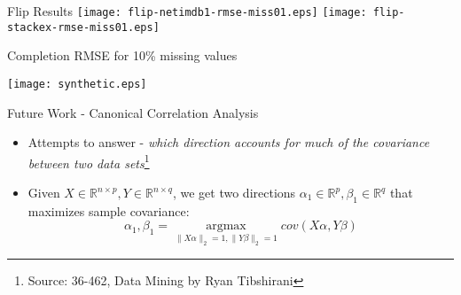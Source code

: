 \documentclass{beamer}
\DeclareMathOperator*{\argmax}{argmax}
\begin{document}
\begin{frame}{Flip Results}
	\texttt{[image: flip-netimdb1-rmse-miss01.eps]}
	\texttt{[image: flip-stackex-rmse-miss01.eps]}
\end{frame}

\begin{frame}{Completion RMSE for 10\% missing values}
    \begin{center}
	\texttt{[image: synthetic.eps]} 
\end{center}
\end{frame}


\begin{frame}{Future Work - Canonical Correlation Analysis}
    \begin{itemize}
        \item Attempts to answer - \textit{which direction accounts for much of the covariance between two data sets}\footnote{Source: 36-462, Data Mining by Ryan Tibshirani}
        \item Given $X \in \mathbb R^{n \times p}, Y \in \mathbb R^{n \times q}$, we get two directions $\alpha_1 \in \mathbb R^p, \beta_1 \in \mathbb R^q$ that maximizes sample covariance:
            \begin{equation}
                \alpha_1, \beta_1 = \argmax\limits_{\|X\alpha\|_2=1,\|Y\beta\|_2=1} cov(X\alpha, Y\beta)
            \end{equation}
    \end{itemize}
\end{frame}
\end{document}

